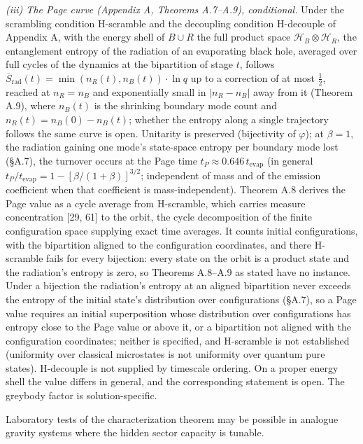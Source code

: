 \documentclass[
]{article}
\begin{document}
\emph{(iii) The Page curve (Appendix A, Theorems A.7--A.9),
conditional.} Under the scrambling condition H-scramble and the
decoupling condition H-decouple of Appendix A, with the energy shell of
\(B \cup R\) the full product space
\(\mathcal{H}_B \otimes \mathcal{H}_R\), the entanglement entropy of the
radiation of an evaporating black hole, averaged over full cycles of the
dynamics at the bipartition of stage \(t\), follows
\(\overline{S}_{\text{rad}}(t) = \min(n_R(t), n_B(t)) \cdot \ln q\) up
to a correction of at most \(\tfrac12\), reached at \(n_R = n_B\) and
exponentially small in \(|n_R - n_B|\) away from it (Theorem A.9), where
\(n_B(t)\) is the shrinking boundary mode count and
\(n_R(t) = n_B(0) - n_B(t)\); whether the entropy along a single
trajectory follows the same curve is open. Unitarity is preserved
(bijectivity of \(\varphi\)); at \(\beta = 1\), the radiation gaining
one mode's state-space entropy per boundary mode lost (§A.7), the
turnover occurs at the Page time
\(t_P \approx 0.646 \, t_{\text{evap}}\) (in general
\(t_P/t_{\text{evap}} = 1 - [\beta/(1+\beta)]^{3/2}\); independent of
mass and of the emission coefficient when that coefficient is
mass-independent). Theorem A.8 derives the Page value as a cycle average
from H-scramble, which carries measure concentration {[}29, 61{]} to the
orbit, the cycle decomposition of the finite configuration space
supplying exact time averages. It counts initial configurations, with
the bipartition aligned to the configuration coordinates, and there
H-scramble fails for every bijection: every state on the orbit is a
product state and the radiation's entropy is zero, so Theorems A.8--A.9
as stated have no instance. Under a bijection the radiation's entropy at
an aligned bipartition never exceeds the entropy of the initial state's
distribution over configurations (§A.7), so a Page value requires an
initial superposition whose distribution over configurations has entropy
close to the Page value or above it, or a bipartition not aligned with
the configuration coordinates; neither is specified, and H-scramble is
not established (uniformity over classical microstates is not uniformity
over quantum pure states). H-decouple is not supplied by timescale
ordering. On a proper energy shell the value differs in general, and the
corresponding statement is open. The greybody factor is
solution-specific.

Laboratory tests of the characterization theorem may be possible in
analogue gravity systems where the hidden sector capacity is tunable.
\end{document}
